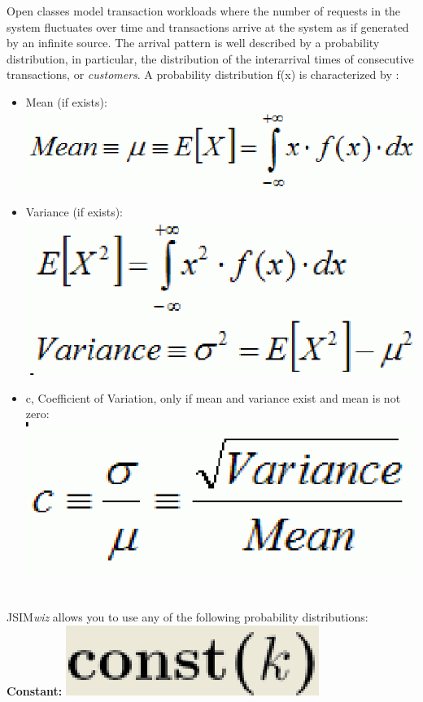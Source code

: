 Open classes model transaction workloads where the number of requests in the system fluctuates over time and transactions arrive at the system as if generated by an infinite source. The arrival pattern is well described by a probability distribution, in particular, the distribution of the interarrival times of consecutive transactions, or \emph{customers}.
A probability distribution f(x) is characterized by : 
\begin{itemize}
\item Mean (if exists): \includegraphics[scale=.5]{img/jsim/Mean.eps}
\item Variance (if exists): \includegraphics[scale=.5]{img/jsim/variance.eps}
\item c, Coefficient of Variation, only if mean and variance exist and mean is not zero: \includegraphics[scale=.5]{img/jsim/CoeffVariation.eps}
\end{itemize}\\
JSIM\emph{wiz} allows you to use any of the following probability distributions:
\\ %
\textbf{Constant: }\includegraphics[scale=.5]{img/jsim/constant_f.eps}
